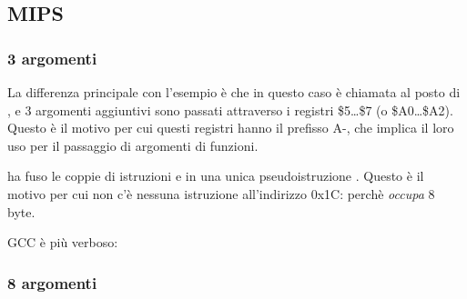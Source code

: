\subsection{MIPS}

\subsubsection{3 argomenti}


La differenza principale con l'esempio \q{\HelloWorldSectionName} è che in questo caso \printf è chiamata 
al posto di \puts, e 3 argomenti aggiuntivi sono passati attraverso i registri \$5\dots \$7 (o \$A0\dots \$A2).
Questo è il motivo per cui questi registri hanno il prefisso A-, che implica il loro uso per il passaggio di argomenti di funzioni.





\IDA ha fuso le coppie di istruzioni  e  in una unica pseudoistruzione .
Questo è il motivo per cui non c'è nessuna istruzione all'indirizzo 0x1C: perchè  \emph{occupa} 8 byte.%


\NonOptimizing GCC è più verboso:





\subsubsection{8 argomenti}

